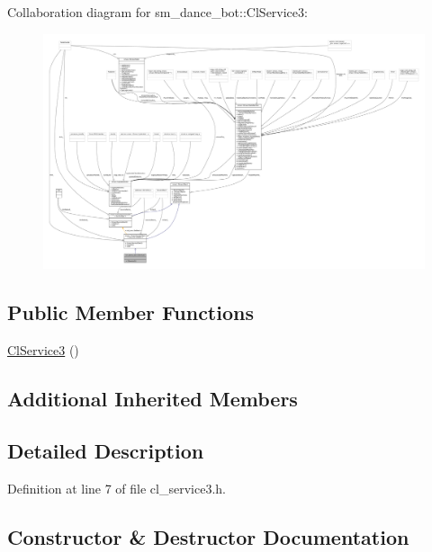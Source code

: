 Collaboration diagram for sm\+\_\+dance\+\_\+bot\+:\+:Cl\+Service3\+:
\nopagebreak
\begin{figure}[H]
\begin{center}
\leavevmode
\includegraphics[width=350pt]{classsm__dance__bot_1_1ClService3__coll__graph}
\end{center}
\end{figure}
\subsection*{Public Member Functions}
\begin{DoxyCompactItemize}
\item 
\hyperlink{classsm__dance__bot_1_1ClService3_a3b2381bb40ed3d46e4f93d71e2c902e5}{Cl\+Service3} ()
\end{DoxyCompactItemize}
\subsection*{Additional Inherited Members}


\subsection{Detailed Description}


Definition at line 7 of file cl\+\_\+service3.\+h.



\subsection{Constructor \& Destructor Documentation}
